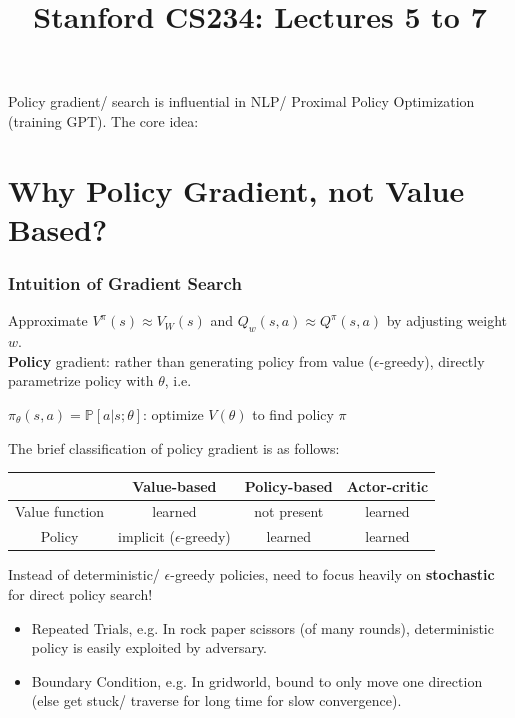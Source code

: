 \documentclass{article}
\title{Stanford CS234: Lectures 5 to 7}
\begin{document}
Policy gradient/ search is influential in NLP/ Proximal Policy Optimization (training GPT). The core idea:

\section{Why Policy Gradient, not Value Based?}
\begin{defbox}
    \subsubsection*{Intuition of Gradient Search}
    Approximate $V^{\pi}(s) \approx V_{W}(s)$ and $Q_w(s, a) \approx Q^{\pi}(s, a)$ by adjusting weight $w$.
    \\\textbf{Policy} gradient: rather than generating policy from value ($\epsilon$-greedy), directly parametrize policy with $\theta$, i.e.
    \begin{center}
        $\pi_{\theta} (s, a) = \mathbb{P}[a | s; \theta]$: optimize $V(\theta)$ to find policy $\pi$
    \end{center}
\end{defbox}

The brief classification of policy gradient is as follows:
\begin{center}
    \begin{tabular}{|c||c|c|c|}
    \hline
      & Value-based & Policy-based & Actor-critic \\ \hline
    Value function & learned & not present & learned \\ \hline
    Policy & implicit ($\epsilon$-greedy) & learned & learned\\ \hline
    \end{tabular}
\end{center}

Instead of deterministic/ $\epsilon$-greedy policies, need to focus heavily on \textbf{stochastic} for direct policy search!
\begin{itemize}
\item Repeated Trials, e.g. In rock paper scissors (of many rounds), deterministic policy is easily exploited by adversary.
\item Boundary Condition, e.g. In gridworld, bound to only move one direction (else get stuck/ traverse for long time for slow convergence).
\end{itemize}
\end{document}
